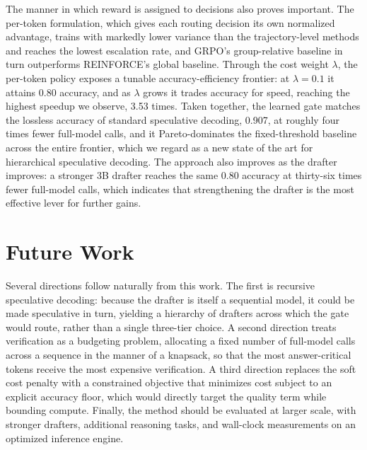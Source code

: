 \documentclass[11pt]{article}
\begin{document}
The manner in which reward is assigned to decisions also proves important. The per-token formulation,
which gives each routing decision its own normalized advantage, trains with markedly lower variance
than the trajectory-level methods and reaches the lowest escalation rate, and GRPO's group-relative
baseline in turn outperforms REINFORCE's global baseline. Through the cost weight $\lambda$, the
per-token policy exposes a tunable accuracy-efficiency frontier: at $\lambda=0.1$ it attains 0.80
accuracy, and as $\lambda$ grows it trades accuracy for speed, reaching the highest speedup we observe,
3.53 times. Taken together, the learned gate matches the lossless accuracy of standard speculative
decoding, 0.907, at roughly four times fewer full-model calls, and it Pareto-dominates the
fixed-threshold baseline across the entire frontier, which we regard as a new state of the art for
hierarchical speculative decoding. The approach also improves as the drafter improves: a stronger 3B
drafter reaches the same 0.80 accuracy at thirty-six times fewer full-model calls, which indicates that
strengthening the drafter is the most effective lever for further gains.

\section{Future Work}
Several directions follow naturally from this work. The first is recursive speculative decoding:
because the drafter is itself a sequential model, it could be made speculative in turn, yielding a
hierarchy of drafters across which the gate would route, rather than a single three-tier choice. A second direction treats verification as a budgeting problem, allocating a fixed
number of full-model calls across a sequence in the manner of a knapsack, so that the most
answer-critical tokens receive the most expensive verification. A third direction replaces the soft
cost penalty with a constrained objective that minimizes cost subject to an explicit accuracy floor,
which would directly target the quality term while bounding compute. Finally, the method should be
evaluated at larger scale, with stronger drafters, additional reasoning tasks, and wall-clock
measurements on an optimized inference engine.
\end{document}
